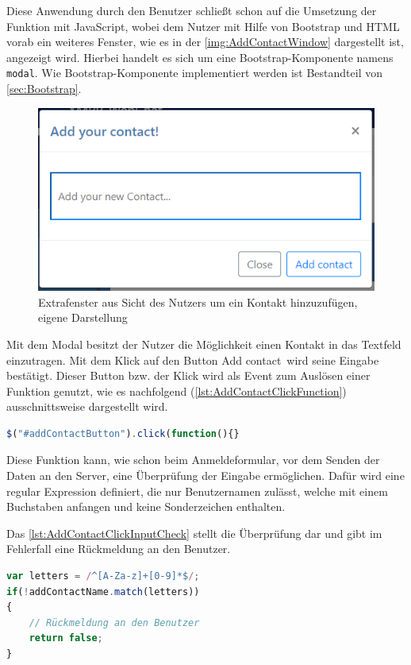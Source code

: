 \documentclass[a4paper,titlepage,halfparskip,12pt]{scrreprt}
\begin{document}
\begin{onehalfspacing}
Diese Anwendung durch den Benutzer schließt schon auf die Umsetzung der Funktion mit JavaScript, wobei dem Nutzer mit Hilfe von Bootstrap und \ac{HTML} vorab ein weiteres Fenster, wie es in der \autoref{img:AddContactWindow} dargestellt ist, angezeigt wird. Hierbei handelt es sich um eine Bootstrap-Komponente namens \texttt{modal}. Wie Bootstrap-Komponente implementiert werden ist Bestandteil von \autoref{sec:Bootstrap}. 
\begin{figure}[h]
	\centering
	\includegraphics[scale=1.0]{images/AddContactWindow}
	\caption{Extrafenster aus Sicht des Nutzers um ein Kontakt hinzuzufügen, eigene Darstellung}
	\label{img:AddContactWindow}
\end{figure}
Mit dem Modal besitzt der Nutzer die Möglichkeit einen Kontakt in das Textfeld einzutragen. Mit dem Klick auf den Button \glqq Add contact\grqq\ wird seine Eingabe bestätigt. Dieser Button bzw. der Klick wird als Event zum Auslösen einer Funktion genutzt, wie es nachfolgend (\autoref{lst:AddContactClickFunction}) ausschnittsweise dargestellt wird.
\begin{lstlisting}[language=Javascript,caption=Funktionsverknüpfung an den Kontak hinzufügen Button unter JS,label={lst:AddContactClickFunction}]
$("#addContactButton").click(function(){}
\end{lstlisting}
Diese Funktion kann, wie schon beim Anmeldeformular, vor dem Senden der Daten an den Server, eine Überprüfung der Eingabe ermöglichen. Dafür wird eine regular Expression definiert, die nur Benutzernamen zulässt, welche mit einem Buchstaben anfangen und keine Sonderzeichen enthalten.

Das \autoref{lst:AddContactClickInputCheck} stellt die Überprüfung dar und gibt im Fehlerfall eine Rückmeldung an den Benutzer.
\begin{lstlisting}[language=Javascript,caption=Überprüfung der Eingabe mittels eines regulären Ausdrucks,label={lst:AddContactClickInputCheck}]
var letters = /^[A-Za-z]+[0-9]*$/;
if(!addContactName.match(letters))
{
	// Rückmeldung an den Benutzer
	return false;
}
\end{lstlisting}


\end{onehalfspacing}
\end{document}
